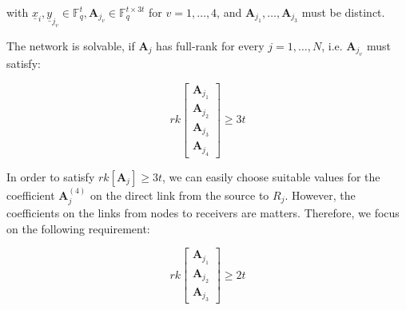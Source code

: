 with $\underline{x}_{i},\underline{y}_{j_{v}}\in\ensuremath{\mathbb{F}}_{q}^{t},\boldsymbol{A}_{j_{v}}\in\ensuremath{\mathbb{F}}_{q}^{t\times3t}$
for $v=1,\ldots,4$, and $\boldsymbol{A}_{j_{1}},\ldots,\boldsymbol{A}_{j_{3}}$
must be distinct.

The network is solvable, if $\boldsymbol{A}_{j}$ has full-rank for
every $j=1,\ldots,N$, i.e. $\boldsymbol{A}_{j_{v}}$ must satisfy:

\[
rk\left[\begin{array}{c}
\boldsymbol{A}_{j_{1}}\\
\boldsymbol{A}_{j_{2}}\\
\boldsymbol{A}_{j_{3}}\\
\boldsymbol{A}_{j_{4}}
\end{array}\right]\geq3t
\]

In order to satisfy $rk\left[\boldsymbol{A}_{j}\right]\geq3t$, we
can easily choose suitable values for the coefficient $\boldsymbol{A}_{j}^{(4)}$
on the direct link from the source to $R_{j}$. However, the coefficients
on the links from nodes to receivers are matters. Therefore, we focus
on the following requirement:

\begin{equation}
rk\left[\begin{array}{c}
\boldsymbol{A}_{j_{1}}\\
\boldsymbol{A}_{j_{2}}\\
\boldsymbol{A}_{j_{3}}
\end{array}\right]\geq2t\label{eq:rk_rqm_e1l1h3s4}
\end{equation}

